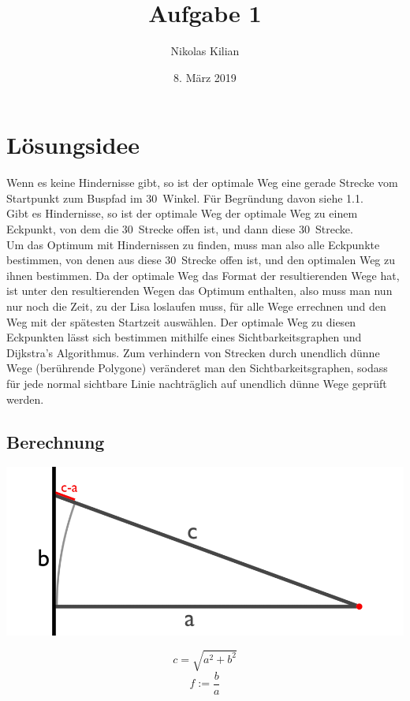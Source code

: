 \documentclass[12pt]{article}
\title{\vspace{-2.0cm}Aufgabe 1}
\author{Nikolas Kilian}
\date{8. März 2019}
\begin{document}
\maketitle

\section{Lösungsidee}
Wenn es keine Hindernisse gibt, so ist der optimale Weg eine gerade Strecke vom Startpunkt zum Buspfad im 30\degree\ Winkel. Für Begründung davon siehe 1.1.\\
Gibt es Hindernisse, so ist der optimale Weg der optimale Weg zu einem Eckpunkt, von dem die 30\degree\ Strecke offen ist, und dann diese 30\degree\ Strecke.\\
Um das Optimum mit Hindernissen zu finden, muss man also alle Eckpunkte bestimmen, von denen aus diese 30\degree\ Strecke offen ist, und den optimalen Weg zu ihnen bestimmen. Da der optimale Weg das Format der resultierenden Wege hat, ist unter den resultierenden Wegen das Optimum enthalten, also muss man nun nur noch die Zeit, zu der Lisa loslaufen muss, für alle Wege errechnen und den Weg mit der spätesten Startzeit auswählen.
Der optimale Weg zu diesen Eckpunkten lässt sich bestimmen mithilfe eines Sichtbarkeitsgraphen und Dijkstra's Algorithmus. Zum verhindern von Strecken durch unendlich dünne Wege (berührende Polygone) veränderet man den Sichtbarkeitsgraphen, sodass für jede normal sichtbare Linie nachträglich auf unendlich dünne Wege geprüft werden.

\subsection{Berechnung}
\newcommand{\vb}{v_{Bus}}
\newcommand{\vl}{v_{Lisa}}

\newcommand{\x}{x}

\renewcommand{\a}{a}
\renewcommand{\b}{b}
\renewcommand{\c}{c}

\newcommand{\f}{f}
\newcommand{\fzero}{f_0}

\newcommand{\tf}{t(\f)}
\newcommand{\tfzero}{t(\fzero)}
\newcommand{\df}[1]{\frac{d#1}{d\f}}
\newcommand{\dtf}{\df{\tf}}
\newcommand{\dtfzero}{\df{\tfzero}}

\begin{minipage}{0.8\textwidth}
\includegraphics[scale=0.4]{CalcLabel}
\end{minipage}
\begin{minipage}{0.15\textwidth}
\vspace{-1cm}
\[\c=\sqrt{\a^2+\b^2}\]
\[\f:=\frac{\b}{\a}\]%
\end{minipage}
\end{document}
